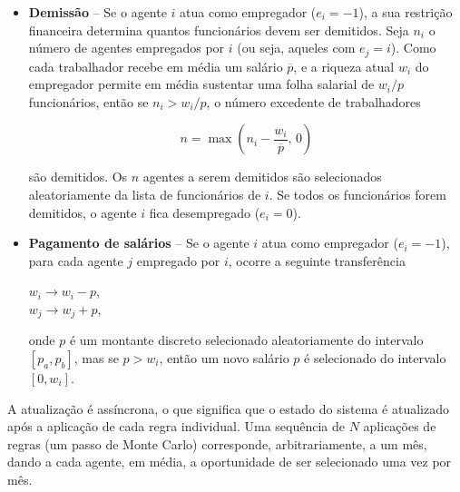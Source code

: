 \begin{itemize}
Modificamos esta regra, introduzindo dois novos parâmetros, nomeadamente,  $\Omega_M$, associado à frequência das visitas ao mercado, e $\Phi_M$, representando a fração da riqueza retirada do valor de mercado. Também relaxamos a condição de que necessariamente $i=j$.
%
Se $\Omega_M\leq1$, isso denota a probabilidade de que essa regra seja aplicada.
Caso contrário, $\Omega_M$ especifica o número de vezes que a regra é aplicada.  Para cada aplicação, um novo agente aleatório $j$ é selecionado; se $j$  não estiver desempregado ($e_i\neq 0$), um valor aleatório é extraído do intervalo $w \in [0, \Phi_M V]$.

\item \textbf{Demissão} -- Se o agente $i$ atua como empregador ($e_i=-1$), a sua restrição financeira determina quantos funcionários devem ser demitidos. Seja $n_i$ o número de agentes empregados por $i$ (ou seja, aqueles com $e_j=i$). Como cada trabalhador recebe em média um salário $\overline{p}$,  e a riqueza atual  $w_i$ do empregador permite em média sustentar uma folha salarial de  $w_i/p$ funcionários, então se $n_i > w_i/p$, o número excedente de trabalhadores

\begin{equation}
n = \max\!\left(n_i - \frac{w_i}{\overline{p}},\,0\right)
\end{equation}

são demitidos. Os $n$ agentes a serem demitidos são selecionados aleatoriamente da lista de funcionários de $i$. Se todos os funcionários forem demitidos, o agente $i$ fica desempregado ($e_i=0$).

\item  \textbf{Pagamento de salários} -- 
 Se o agente $i$ atua como empregador ($e_i=-1$), para cada agente $j$ empregado por $i$, ocorre a seguinte transferência  
\begin{center}  
  $w_i  \to w_i-p$,  \\
  $w_j  \to w_j+p$,
\end{center}
onde $p$ é um montante discreto selecionado aleatoriamente do intervalo $[p_a,p_b]$, mas se $p > w_i$, então um novo salário $p$ é selecionado do intervalo $[0,w_i]$.
\end{itemize}
  

A atualização é assíncrona, o que significa que o estado do sistema é atualizado após a aplicação de cada regra individual. Uma sequência de $N$ aplicações de regras (um passo de Monte Carlo) corresponde, arbitrariamente, a um mês, dando a cada agente, em média, a oportunidade de ser selecionado uma vez por mês. 

